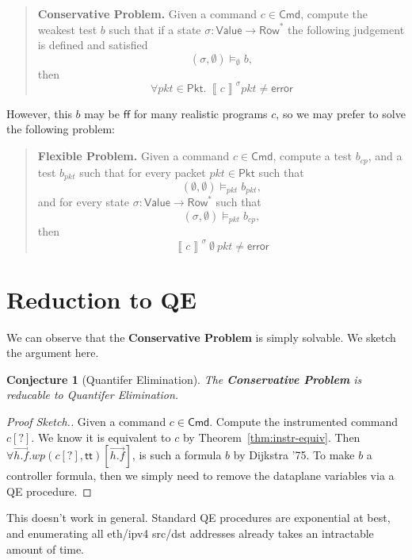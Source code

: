 \documentclass{article}
\newcommand{\pkt}{\mathit{pkt}}
\newcommand{\error}{\mathsf{error}}
\newcommand{\denote}[1]{\left\llbracket#1\right\rrbracket}
\newcommand{\TRUE}{\mathsf{tt}}
\newcommand{\FALSE}{\mathsf{ff}}
\newcommand{\Value}{\mathsf{Value}}
\newcommand{\Cmd}{\mathsf{Cmd}}
\newcommand{\Pkt}{\mathsf{Pkt}}
\newcommand{\Row}{\mathsf{Row}}
\newcommand{\WP}{\textit{wp}}
\newcommand{\satisfy}[3]{({#1,#3}) \models_{#2}}
\newtheorem{conjecture}{Conjecture}
\begin{document}
\begin{quote}
  \textbf{Conservative Problem.} Given a command $c \in \Cmd$, compute the weakest test
  $b$ such that if a state $\sigma : \Value \to \Row^*$ the following
  judgement is defined and satisfied \[\satisfy\sigma\emptyset\emptyset b,\] then \[\forall \pkt \in \Pkt.~
  \denote{c}^\sigma \pkt \neq \error \]
\end{quote}

However, this $b$ may be $\FALSE$ for many realistic programs $c$, so we may
prefer to solve the following problem:

\begin{quote}
  \textbf{Flexible Problem.} Given a command $c \in \Cmd$, compute a test
  $b_{\mathit{cp}}$, and a test $b_{\mathit{pkt}}$ such that
  for every packet $\pkt \in \Pkt$ such that
  \[\satisfy \emptyset \pkt \emptyset b_{\mathit{pkt}},\]
  and for every state $\sigma : \Value \to \Row^*$ such that
  \[\satisfy \sigma \pkt \emptyset b_{\mathit{cp}},\]
  then \[\denote{c}^\sigma ~\emptyset~\pkt \neq \error \]
\end{quote}



\section{Reduction to QE}

We can observe that the \textbf{Conservative Problem} is simply solvable. We
sketch the argument here.

\begin{conjecture}[Quantifer Elimination]
  The \textbf{\textrm{Conservative Problem}} is reducable to Quantifer Elimination.
\end{conjecture}

\begin{proof}[Proof Sketch.]
  Given a command $c \in \Cmd$. Compute the instrumented command $c[?]$. We know
  it is equivalent to $c$ by Theorem~\ref{thm:instr-equiv}. Then $\forall
  \overrightarrow{h.f}.\WP(c[?],\TRUE)[\overrightarrow{h.f}]$, is such a
  formula $b$ by Dijkstra '75. To make $b$ a controller formula, then we simply
  need to remove the dataplane variables via a QE procedure.
\end{proof}

This doesn't work in general. Standard QE procedures are exponential at best, and
enumerating all eth/ipv4 src/dst addresses already takes an intractable amount
of time.
\end{document}
